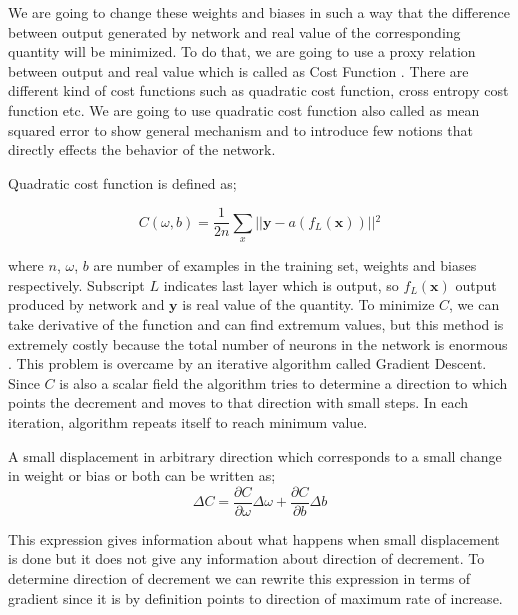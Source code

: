 \documentclass[a4paper,times,12pt]{article}
\begin{document}
We are going to change these weights and biases in such a way that the difference between output generated by network and real value of the corresponding quantity will be minimized. To do that, we are going to use a proxy relation between output and real value which is called as Cost Function \cite{nielsen2015neural}. There are different kind of cost functions such as quadratic cost function, cross entropy cost function etc. We are going to use quadratic cost function also called as mean squared error to show general mechanism and to introduce few notions that directly effects the behavior of the network. 


Quadratic cost function is defined as;

\begin{equation}
\label{eq:NT_Quadratic}
C(\omega, b) = \frac{1}{2n} \sum\limits_{x} || \boldsymbol{y} - a(f_L(\boldsymbol{x})) ||{^2} 
\end{equation}

\noindent where $n$, $\omega$, $b$ are number of examples in the training set, weights and biases respectively. Subscript $L$ indicates last layer which is output, so $f_L(\boldsymbol{x})$ output produced by network and $\boldsymbol{y}$ is real value of the quantity. To minimize $C$, we can take derivative of the function and can find extremum values, but this method is extremely costly because the total number of neurons in the network is enormous \cite{nielsen2015neural}. This problem is overcame by an iterative algorithm called Gradient Descent. Since $C$ is also a scalar field the algorithm tries to determine a direction to which points the decrement and moves to that direction with small steps. In each iteration, algorithm repeats itself to reach minimum value. 

A small displacement in arbitrary direction which corresponds to a small change in weight or bias or both can be written as;
\begin{equation}
\label{eq:NT_Quadratic_min}
\Delta{C} = \frac{\partial{C}}{\partial{\omega}}\Delta{\omega} + \frac{\partial{C}}{\partial{b}}\Delta{b}
\end{equation}

\noindent This expression gives information about what happens when small displacement is done but it does not give any information about direction of decrement. To determine direction of decrement we can rewrite this expression in terms of gradient since it is by definition points to direction of maximum rate of increase. 
\end{document}
